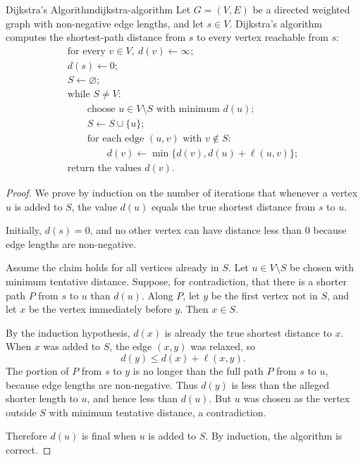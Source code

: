 \begin{theorem}{Dijkstra's Algorithm}{dijkstra-algorithm}
Let \(G=(V,E)\) be a directed weighted graph with non-negative edge lengths, and let \(s\in V\). Dijkstra's algorithm computes the shortest-path distance from \(s\) to every vertex reachable from \(s\):
\[
\begin{array}{l}
\text{for every }v\in V,\ d(v)\leftarrow \infty;\\
d(s)\leftarrow 0;\\
S\leftarrow \varnothing;\\[0.2em]
\text{while }S\neq V:\\
\qquad \text{choose }u\in V\setminus S\text{ with minimum }d(u);\\
\qquad S\leftarrow S\cup\{u\};\\
\qquad \text{for each edge }(u,v)\text{ with }v\notin S:\\
\qquad\qquad d(v)\leftarrow \min\{d(v),d(u)+\ell(u,v)\};\\
\text{return the values }d(v).
\end{array}
\]
\end{theorem}

\begin{proof}
We prove by induction on the number of iterations that whenever a vertex \(u\) is added to \(S\), the value \(d(u)\) equals the true shortest distance from \(s\) to \(u\).

Initially, \(d(s)=0\), and no other vertex can have distance less than \(0\) because edge lengths are non-negative.

Assume the claim holds for all vertices already in \(S\). Let \(u\in V\setminus S\) be chosen with minimum tentative distance. Suppose, for contradiction, that there is a shorter path \(P\) from \(s\) to \(u\) than \(d(u)\). Along \(P\), let \(y\) be the first vertex not in \(S\), and let \(x\) be the vertex immediately before \(y\). Then \(x\in S\).

By the induction hypothesis, \(d(x)\) is already the true shortest distance to \(x\). When \(x\) was added to \(S\), the edge \((x,y)\) was relaxed, so
\[
d(y)\le d(x)+\ell(x,y).
\]
The portion of \(P\) from \(s\) to \(y\) is no longer than the full path \(P\) from \(s\) to \(u\), because edge lengths are non-negative. Thus \(d(y)\) is less than the alleged shorter length to \(u\), and hence less than \(d(u)\). But \(u\) was chosen as the vertex outside \(S\) with minimum tentative distance, a contradiction.

Therefore \(d(u)\) is final when \(u\) is added to \(S\). By induction, the algorithm is correct.
\end{proof}

